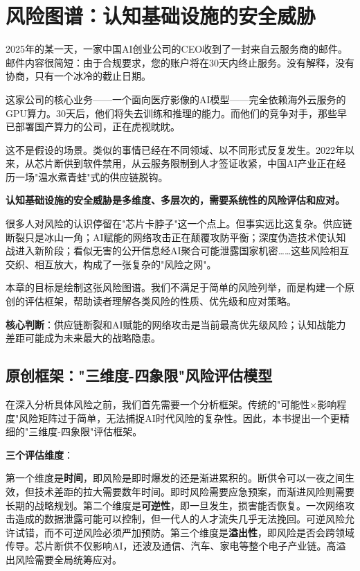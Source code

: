 \chapter{风险图谱：认知基础设施的安全威胁}

2025年的某一天，一家中国AI创业公司的CEO收到了一封来自云服务商的邮件。邮件内容很简短：由于合规要求，您的账户将在30天内终止服务。没有解释，没有协商，只有一个冰冷的截止日期。

这家公司的核心业务——一个面向医疗影像的AI模型——完全依赖海外云服务的GPU算力。30天后，他们将失去训练和推理的能力。而他们的竞争对手，那些早已部署国产算力的公司，正在虎视眈眈。

这不是假设的场景。类似的事情已经在不同领域、以不同形式反复发生。2022年以来，从芯片断供到软件禁用，从云服务限制到人才签证收紧，中国AI产业正在经历一场"温水煮青蛙"式的供应链脱钩。

\textbf{认知基础设施的安全威胁是多维度、多层次的，需要系统性的风险评估和应对。}

很多人对风险的认识停留在"芯片卡脖子"这一个点上。但事实远比这复杂。供应链断裂只是冰山一角；AI赋能的网络攻击正在颠覆攻防平衡；深度伪造技术使认知战进入新阶段；看似无害的公开信息经AI聚合可能泄露国家机密……这些风险相互交织、相互放大，构成了一张复杂的"风险之网"。

本章的目标是绘制这张风险图谱。我们不满足于简单的风险列举，而是构建一个原创的评估框架，帮助读者理解各类风险的性质、优先级和应对策略。

\textbf{核心判断}：供应链断裂和AI赋能的网络攻击是当前最高优先级风险；认知战能力差距可能成为未来最大的战略隐患。

\section{原创框架："三维度-四象限"风险评估模型}

在深入分析具体风险之前，我们首先需要一个分析框架。传统的"可能性×影响程度"风险矩阵过于简单，无法捕捉AI时代风险的复杂性。因此，本书提出一个更精细的"三维度-四象限"评估框架。

\textbf{三个评估维度}：

第一个维度是\textbf{时间}，即风险是即时爆发的还是渐进累积的。断供令可以一夜之间生效，但技术差距的拉大需要数年时间。即时风险需要应急预案，而渐进风险则需要长期的战略规划。第二个维度是\textbf{可逆性}，即一旦发生，损害能否恢复。一次网络攻击造成的数据泄露可能可以控制，但一代人的人才流失几乎无法挽回。可逆风险允许试错，而不可逆风险必须严加预防。第三个维度是\textbf{溢出性}，即风险是否会跨领域传导。芯片断供不仅影响AI，还波及通信、汽车、家电等整个电子产业链。高溢出风险需要全局统筹应对。

